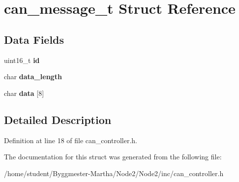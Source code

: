\hypertarget{structcan__message__t}{}\section{can\+\_\+message\+\_\+t Struct Reference}
\label{structcan__message__t}
\subsection*{Data Fields}
\begin{DoxyCompactItemize}
\item 
\mbox{\label{structcan__message__t_ac5d7e171bc59d6e5ead8957faa1259a6}} 
uint16\+\_\+t {\bfseries id}
\item 
\mbox{\label{structcan__message__t_ab3769058723c86113dc6d4d7c8cf2ec0}} 
char {\bfseries data\+\_\+length}
\item 
\mbox{\label{structcan__message__t_a519019132ffdcd9fe783b12c4f280c57}} 
char {\bfseries data} \mbox{[}8\mbox{]}
\end{DoxyCompactItemize}


\subsection{Detailed Description}


Definition at line 18 of file can\+\_\+controller.\+h.



The documentation for this struct was generated from the following file\+:\begin{DoxyCompactItemize}
\item 
/home/student/\+Byggmester-\/\+Martha/\+Node2/\+Node2/inc/can\+\_\+controller.\+h\end{DoxyCompactItemize}
